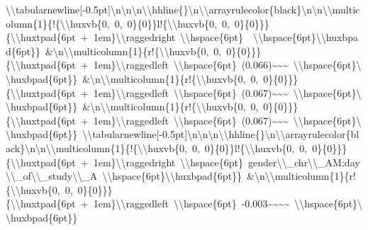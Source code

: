 \documentclass[
  english,
  man]{apa6}
\begin{document}
\textbackslash{}\textbackslash{}tabularnewline{[}-0.5pt{]}\textbackslash{}n\textbackslash{}n\textbackslash{}n\textbackslash{}\textbackslash{}hhline\{\}\textbackslash{}n\textbackslash{}\textbackslash{}arrayrulecolor\{black\}\textbackslash{}n\textbackslash{}n\textbackslash{}\textbackslash{}multicolumn\{1\}\{!\{\textbackslash{}\textbackslash{}huxvb\{0,\ 0,\ 0\}\{0\}\}l!\{\textbackslash{}\textbackslash{}huxvb\{0,\ 0,\ 0\}\{0\}\}\}\{\textbackslash{}\textbackslash{}huxtpad\{6pt\ +\ 1em\}\textbackslash{}\textbackslash{}raggedright\ \textbackslash{}\textbackslash{}hspace\{6pt\}\ \ \textbackslash{}\textbackslash{}hspace\{6pt\}\textbackslash{}\textbackslash{}huxbpad\{6pt\}\}\ \&\textbackslash{}n\textbackslash{}\textbackslash{}multicolumn\{1\}\{r!\{\textbackslash{}\textbackslash{}huxvb\{0,\ 0,\ 0\}\{0\}\}\}\{\textbackslash{}\textbackslash{}huxtpad\{6pt\ +\ 1em\}\textbackslash{}\textbackslash{}raggedleft\ \textbackslash{}\textbackslash{}hspace\{6pt\}\ (0.066)\textasciitilde{}\textasciitilde{}\textasciitilde{}\ \textbackslash{}\textbackslash{}hspace\{6pt\}\textbackslash{}\textbackslash{}huxbpad\{6pt\}\}\ \&\textbackslash{}n\textbackslash{}\textbackslash{}multicolumn\{1\}\{r!\{\textbackslash{}\textbackslash{}huxvb\{0,\ 0,\ 0\}\{0\}\}\}\{\textbackslash{}\textbackslash{}huxtpad\{6pt\ +\ 1em\}\textbackslash{}\textbackslash{}raggedleft\ \textbackslash{}\textbackslash{}hspace\{6pt\}\ (0.067)\textasciitilde{}\textasciitilde{}\textasciitilde{}\ \textbackslash{}\textbackslash{}hspace\{6pt\}\textbackslash{}\textbackslash{}huxbpad\{6pt\}\}\ \&\textbackslash{}n\textbackslash{}\textbackslash{}multicolumn\{1\}\{r!\{\textbackslash{}\textbackslash{}huxvb\{0,\ 0,\ 0\}\{0\}\}\}\{\textbackslash{}\textbackslash{}huxtpad\{6pt\ +\ 1em\}\textbackslash{}\textbackslash{}raggedleft\ \textbackslash{}\textbackslash{}hspace\{6pt\}\ (0.067)\textasciitilde{}\textasciitilde{}\textasciitilde{}\ \textbackslash{}\textbackslash{}hspace\{6pt\}\textbackslash{}\textbackslash{}huxbpad\{6pt\}\}\ \textbackslash{}\textbackslash{}tabularnewline{[}-0.5pt{]}\textbackslash{}n\textbackslash{}n\textbackslash{}n\textbackslash{}\textbackslash{}hhline\{\}\textbackslash{}n\textbackslash{}\textbackslash{}arrayrulecolor\{black\}\textbackslash{}n\textbackslash{}n\textbackslash{}\textbackslash{}multicolumn\{1\}\{!\{\textbackslash{}\textbackslash{}huxvb\{0,\ 0,\ 0\}\{0\}\}l!\{\textbackslash{}\textbackslash{}huxvb\{0,\ 0,\ 0\}\{0\}\}\}\{\textbackslash{}\textbackslash{}huxtpad\{6pt\ +\ 1em\}\textbackslash{}\textbackslash{}raggedright\ \textbackslash{}\textbackslash{}hspace\{6pt\}\ gender\textbackslash{}\textbackslash{}\_chr\textbackslash{}\textbackslash{}\_AM:day\textbackslash{}\textbackslash{}\_of\textbackslash{}\textbackslash{}\_study\textbackslash{}\textbackslash{}\_A\ \textbackslash{}\textbackslash{}hspace\{6pt\}\textbackslash{}\textbackslash{}huxbpad\{6pt\}\}\ \&\textbackslash{}n\textbackslash{}\textbackslash{}multicolumn\{1\}\{r!\{\textbackslash{}\textbackslash{}huxvb\{0,\ 0,\ 0\}\{0\}\}\}\{\textbackslash{}\textbackslash{}huxtpad\{6pt\ +\ 1em\}\textbackslash{}\textbackslash{}raggedleft\ \textbackslash{}\textbackslash{}hspace\{6pt\}\ -0.003\textasciitilde{}\textasciitilde{}\textasciitilde{}\textasciitilde{}\ \textbackslash{}\textbackslash{}hspace\{6pt\}\textbackslash{}\textbackslash{}huxbpad\{6pt\}\}\ 
\end{document}
